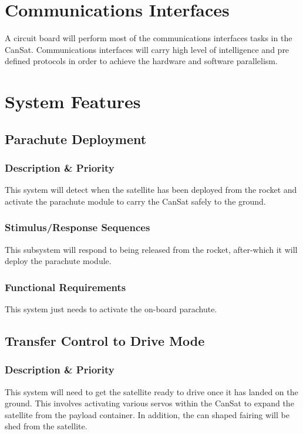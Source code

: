 \documentclass[10pt,onecolumn,draftclsnofoot,document]{IEEEtran}
\begin{document}
\section{Communications Interfaces}
A circuit board will perform most of the communications interfaces tasks in the CanSat. Communications interfaces will carry high level of intelligence and pre defined protocols in order to achieve the hardware and software parallelism. 

\section{System Features}
\subsection{Parachute Deployment}
\subsubsection{Description \& Priority}
This system will detect when the satellite has been deployed from the rocket and activate the parachute module to carry the CanSat safely to the ground.

\subsubsection{Stimulus/Response Sequences}
This  subsystem will respond to being released from the rocket, after-which it will deploy the parachute module.

\subsubsection{Functional Requirements}
This system just needs to activate the on-board parachute.

\subsection{Transfer Control to Drive Mode}
\subsubsection{Description \& Priority}
This system will need to get the satellite ready to drive once it has landed on the ground. This involves activating various servos within the CanSat to expand the satellite from the payload container. In addition, the can shaped fairing will be shed from the satellite.
\end{document}
